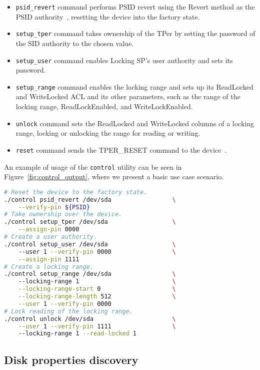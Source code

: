 \begin{itemize}
    \item \verb|psid_revert| command performs PSID revert using the Revert method as the PSID authority~\cite{tcg-psid}, resetting the device into the factory state.
    \item \verb|setup_tper| command takes ownership of the TPer by setting the password of the SID authority to the chosen value.
    \item \verb|setup_user| command enables Locking SP's user authority and sets its password.
    \item \verb|setup_range| command enables the locking range and sets up its ReadLocked and WriteLocked ACL and its other parameters, such as the range of the locking range, ReadLockEnabled, and WriteLockEnabled.
    \item \verb|unlock| command sets the ReadLocked and WriteLocked columns of a locking range, locking or unlocking the range for reading or writing.
    \item \verb|reset| command sends the TPER\_RESET command to the device~\cite{tcg-storage-core}.
\end{itemize}

An example of usage of the \verb|control| utility can be seen in Figure~\ref{fig:control_output}, where we present a basic use case scenario.

    \begin{lstlisting}[language=bash,caption={Usage of the \texttt{control} utility},label={fig:control_output},keywordstyle=\color{black}]
# Reset the device to the factory state.
./control psid_revert /dev/sda                 \
    --verify-pin ${PSID}
# Take ownership over the device.
./control setup_tper /dev/sda                  \
    --assign-pin 0000
# Create a user authority.
./control setup_user /dev/sda                  \ 
    --user 1 --verify-pin 0000                 \
    --assign-pin 1111
# Create a locking range.
./control setup_range /dev/sda                 \ 
    --locking-range 1                          \
    --locking-range-start 0                    \
    --locking-range-length 512                 \
    --user 1 --verify-pin 0000
# Lock reading of the locking range.
./control unlock /dev/sda                      \
    --user 1 --verify-pin 1111                 \ 
    --locking-range 1 --read-locked 1
\end{lstlisting}


\subsection{Disk properties discovery}
\label{utility_discovery}

